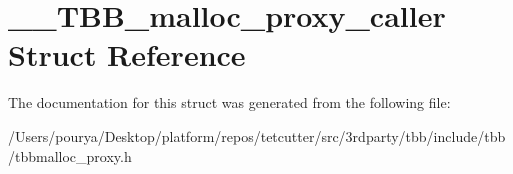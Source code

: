 \hypertarget{struct____TBB__malloc__proxy__caller}{}\section{\+\_\+\+\_\+\+T\+B\+B\+\_\+malloc\+\_\+proxy\+\_\+caller Struct Reference}
\label{struct____TBB__malloc__proxy__caller}


The documentation for this struct was generated from the following file\+:\begin{DoxyCompactItemize}
\item 
/\+Users/pourya/\+Desktop/platform/repos/tetcutter/src/3rdparty/tbb/include/tbb/tbbmalloc\+\_\+proxy.\+h\end{DoxyCompactItemize}
